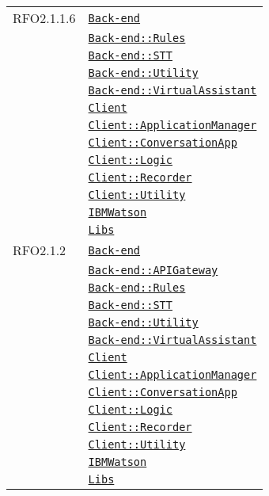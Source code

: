\begin{longtable}{|>{\centering}m{3cm}|m{10cm}<{\centering}|}
RFO2.1.1.6 & \hyperref[Back-end]{\texttt{Back-end}}\\
& \hyperref[Back-end::Rules]{\texttt{Back-end::Rules}}\\
& \hyperref[Back-end::STT]{\texttt{Back-end::STT}}\\
& \hyperref[Back-end::Utility]{\texttt{Back-end::Utility}}\\
& \hyperref[Back-end::VirtualAssistant]{\texttt{Back-end::VirtualAssistant}}\\
& \hyperref[Client]{\texttt{Client}}\\
& \hyperref[Client::ApplicationManager]{\texttt{Client::ApplicationManager}}\\
& \hyperref[Client::ConversationApp]{\texttt{Client::ConversationApp}}\\
& \hyperref[Client::Logic]{\texttt{Client::Logic}}\\
& \hyperref[Client::Recorder]{\texttt{Client::Recorder}}\\
& \hyperref[Client::Utility]{\texttt{Client::Utility}}\\
& \hyperref[IBMWatson]{\texttt{IBMWatson}}\\
& \hyperref[Libs]{\texttt{Libs}}\\ \hline

RFO2.1.2 & \hyperref[Back-end]{\texttt{Back-end}}\\
& \hyperref[Back-end::APIGateway]{\texttt{Back-end::APIGateway}}\\
& \hyperref[Back-end::Rules]{\texttt{Back-end::Rules}}\\
& \hyperref[Back-end::STT]{\texttt{Back-end::STT}}\\
& \hyperref[Back-end::Utility]{\texttt{Back-end::Utility}}\\
& \hyperref[Back-end::VirtualAssistant]{\texttt{Back-end::VirtualAssistant}}\\
& \hyperref[Client]{\texttt{Client}}\\
& \hyperref[Client::ApplicationManager]{\texttt{Client::ApplicationManager}}\\
& \hyperref[Client::ConversationApp]{\texttt{Client::ConversationApp}}\\
& \hyperref[Client::Logic]{\texttt{Client::Logic}}\\
& \hyperref[Client::Recorder]{\texttt{Client::Recorder}}\\
& \hyperref[Client::Utility]{\texttt{Client::Utility}}\\
& \hyperref[IBMWatson]{\texttt{IBMWatson}}\\
& \hyperref[Libs]{\texttt{Libs}}\\ \hline


\end{longtable}
